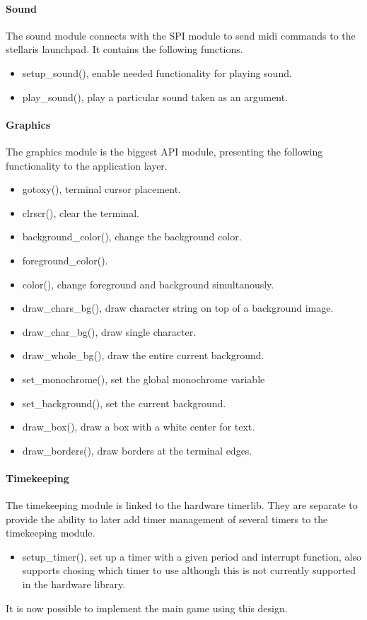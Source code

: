 \paragraph{Sound}
The sound module connects with the SPI module to send midi commands to the stellaris launchpad.
It contains the following functions.
\begin{itemize}
	\item setup\_sound(), enable needed functionality for playing sound.
	\item play\_sound(), play a particular sound taken as an argument.
\end{itemize}

\paragraph{Graphics}
The graphics module is the biggest API module, presenting the following functionality to the
application layer.
\begin{itemize}
	\item gotoxy(), terminal cursor placement.
	\item clrscr(), clear the terminal.
	\item background\_color(), change the background color.
	\item foreground\_color().
	\item color(), change foreground and background simultanously.
	\item draw\_chars\_bg(), draw character string on top of a background image.
	\item draw\_char\_bg(), draw single character.
	\item draw\_whole\_bg(), draw the entire current background.
	\item set\_monochrome(), set the global monochrome variable
	\item set\_background(), set the current background.
	\item draw\_box(), draw a box with a white center for text.
	\item draw\_borders(), draw borders at the terminal edges.
\end{itemize}

\paragraph{Timekeeping}
The timekeeping module is linked to the hardware timerlib. They are separate to provide the ability
to later add timer management of several timers to the timekeeping module.
\begin{itemize}
	\item setup\_timer(), set up a timer with a given period and interrupt function, 
			also supports chosing which timer to use although this is not currently supported
			in the hardware library.
\end{itemize}

It is now possible to implement the main game using this design.
